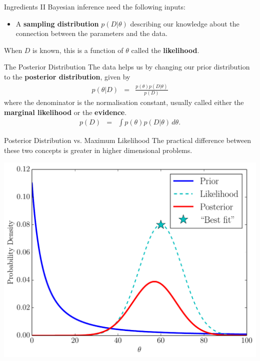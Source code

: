\documentclass{beamer}
\begin{document}
\begin{frame}[t]{Ingredients II}
Bayesian inference need the following inputs:
\begin{itemize}
\item A {\bf sampling distribution} $p(D | \theta)$ describing our knowledge
about the connection between the parameters and the data.
\end{itemize}

When $D$ is known,
this is a function of $\theta$ called the {\bf likelihood}.
\end{frame}


\begin{frame}[t]{The Posterior Distribution}
The data helps us by changing our prior distribution to the {\bf posterior
distribution}, given by
\begin{eqnarray*}
p(\theta | D) &=& \frac{p(\theta) p(D|\theta)}{p(D)}
\end{eqnarray*}
where the denominator is the normalisation constant, usually called either
the {\bf marginal likelihood} or the {\bf evidence}.
\begin{eqnarray*}
p(D) &=& \int p(\theta)p(D|\theta) \, d\theta.
\end{eqnarray*}

\end{frame}

\begin{frame}[t]{Posterior Distribution vs. Maximum Likelihood}
The practical difference between these two concepts is greater in higher
dimensional problems.
\begin{center}
\includegraphics[scale=0.35]{bayes.pdf}
\end{center}
\end{frame}
\end{document}
